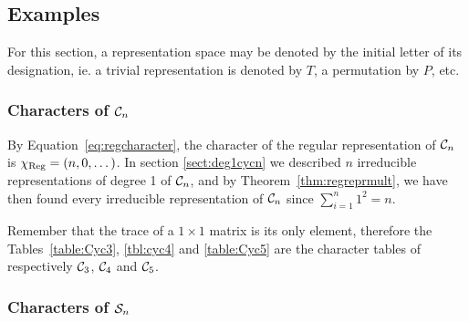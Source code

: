 \subsection{Examples}


\begin{notation}
	For this section, a representation space may be denoted by the initial letter of its designation, ie. a trivial representation is denoted by $T$, a permutation by $P$, etc.
\end{notation}

\subsubsection{Characters of $\mathcal{C}_n$}

\begin{example}
	By Equation~\ref{eq:regcharacter}, the character of the regular representation of $\mathcal{C}_n$ is $\chi_{\text{Reg}} = (n, 0, \dots)$. In section \ref{sect:deg1cycn} we described $n$ irreducible representations of degree 1 of  $\mathcal{C}_n$, and by Theorem~\ref{thm:regreprmult}, we have then found every irreducible representation of $\mathcal{C}_n$ since $\sum_{i=1}^n 1^2 = n$.
	
	Remember that the trace of a $1 \times 1$ matrix is its only element, therefore the Tables~\ref{table:Cyc3}, \ref{tbl:cyc4} and \ref{table:Cyc5} are the character tables of respectively $\mathcal{C}_3$, $\mathcal{C}_4$ and $\mathcal{C}_5$.
\end{example}

\subsubsection{Characters of $\mathcal{S}_n$}
	
